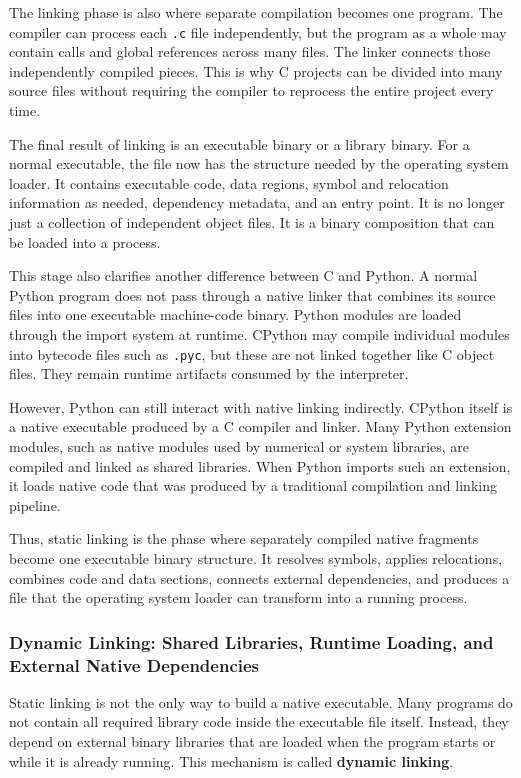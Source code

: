 The linking phase is also where separate compilation becomes one program. The compiler can process each \texttt{.c} file independently, but the program as a whole may contain calls and global references across many files. The linker connects those independently compiled pieces. This is why C projects can be divided into many source files without requiring the compiler to reprocess the entire project every time.

The final result of linking is an executable binary or a library binary. For a normal executable, the file now has the structure needed by the operating system loader. It contains executable code, data regions, symbol and relocation information as needed, dependency metadata, and an entry point. It is no longer just a collection of independent object files. It is a binary composition that can be loaded into a process.

This stage also clarifies another difference between C and Python. A normal Python program does not pass through a native linker that combines its source files into one executable machine-code binary. Python modules are loaded through the import system at runtime. CPython may compile individual modules into bytecode files such as \texttt{.pyc}, but these are not linked together like C object files. They remain runtime artifacts consumed by the interpreter.

However, Python can still interact with native linking indirectly. CPython itself is a native executable produced by a C compiler and linker. Many Python extension modules, such as native modules used by numerical or system libraries, are compiled and linked as shared libraries. When Python imports such an extension, it loads native code that was produced by a traditional compilation and linking pipeline.

Thus, static linking is the phase where separately compiled native fragments become one executable binary structure. It resolves symbols, applies relocations, combines code and data sections, connects external dependencies, and produces a file that the operating system loader can transform into a running process.




\subsubsection{Dynamic Linking: Shared Libraries, Runtime Loading, and External Native Dependencies}

Static linking is not the only way to build a native executable. Many programs do not contain all required library code inside the executable file itself. Instead, they depend on external binary libraries that are loaded when the program starts or while it is already running. This mechanism is called \textbf{dynamic linking}.


